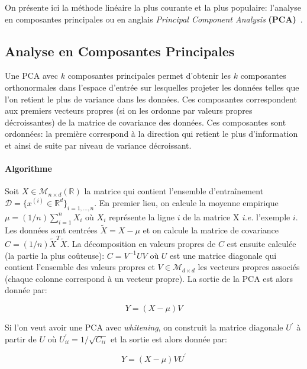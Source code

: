 On présente ici la méthode linéaire la plus courante et la plus populaire:
l'analyse en composantes principales ou en anglais \textit{Principal Component
Analysis} \textbf{(PCA)}~\cite{Pearson-1901,Hotelling1933}.

\subsection{Analyse en Composantes Principales} \label{sec:pca}

Une PCA avec $k$ composantes principales permet d'obtenir les $k$ composantes
orthonormales dans l'espace d'entrée sur lesquelles projeter les données telles
que l'on retient le plus de variance dans les données. Ces composantes
correspondent aux premiers vecteurs propres (si on les ordonne par valeurs
propres décroissantes) de la matrice de covariance des données.  Ces
composantes sont ordonnées: la première correspond à la direction qui retient
le plus d'information et ainsi de suite par niveau de variance décroissant.

\paragraph{Algorithme} Soit $X\in\mathcal{M}_{n\times d}(\mathbb{R})$ la
matrice qui contient l'ensemble d'entraînement $\mathcal{D}=\lbrace
x^{(i)}\in\mathbb{R}^d \rbrace_{i=1,\dots,n}$.  En premier lieu, on calcule la
moyenne empirique $\mu=(1/n)\sum_{i=1}^{n}X_i$ où $X_i$ représente la ligne $i$
de la matrice X \textit{i.e.} l'exemple $i$. Les données sont centrées
$\tilde{X}=X-\mu$ et on calcule la matrice de covariance
$C=(1/n)\tilde{X}^T\tilde{X}$. La décomposition en valeurs propres de $C$ est
ensuite calculée (la partie la plus co\^uteuse): $C=V^{-1}UV$ où
$U$ est une matrice diagonale qui contient l'ensemble des valeurs propres
et $V\in\mathcal{M}_{d\times d}$ les vecteurs propres associés (chaque colonne
correspond à un vecteur propre). La sortie de la PCA est alors donnée par:

\begin{equation}
Y=(X-\mu)V
\end{equation}

Si l'on veut avoir une PCA avec \textit{whitening}, on construit la matrice
diagonale $U^{'}$ à partir de $U$ où $U^{'}_{ii}=1/\sqrt{C_{ii}}$ et la sortie
est alors donnée par:

\begin{equation}
Y=(X-\mu)VU^{'}
\end{equation}


